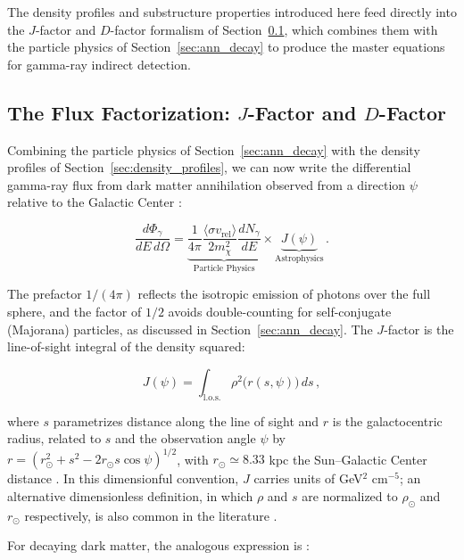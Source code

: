 The density profiles and substructure properties introduced here feed directly into the $J$-factor and $D$-factor formalism of Section~\ref{sec:jfactor}, which combines them with the particle physics of Section~\ref{sec:ann_decay} to produce the master equations for gamma-ray indirect detection.

\subsection{The Flux Factorization: $J$-Factor and $D$-Factor}
\label{sec:jfactor}

Combining the particle physics of Section~\ref{sec:ann_decay} with the density profiles of Section~\ref{sec:density_profiles}, we can now write the differential gamma-ray flux from dark matter annihilation observed from a direction $\psi$ relative to the Galactic Center \cite{Cirelli:2024ssz,Hooper:2024}:

\begin{equation}
	\frac{d\Phi_\gamma}{dE\, d\Omega} = \underbrace{\frac{1}{4\pi} \frac{\langle \sigma v_\text{rel} \rangle}{2 m_\chi^2} \frac{dN_\gamma}{dE}}_{\text{Particle Physics}} \times \underbrace{J(\psi)}_{\text{Astrophysics}} \,.
	\label{eq:flux_ann}
\end{equation}

The prefactor $1/(4\pi)$ reflects the isotropic emission of photons over the full sphere, and the factor of $1/2$ avoids double-counting for self-conjugate (Majorana) particles, as discussed in Section~\ref{sec:ann_decay}.
The $J$-factor is the line-of-sight integral of the density squared:

\begin{equation}
	J(\psi) = \int_\text{l.o.s.} \rho^2\bigl(r(s, \psi)\bigr) \, ds \,,
	\label{eq:jfactor}
\end{equation}

where $s$ parametrizes distance along the line of sight and $r$ is the galactocentric radius, related to $s$ and the observation angle $\psi$ by $r = (r_\odot^2 + s^2 - 2 r_\odot s \cos\psi)^{1/2}$, with $r_\odot \simeq 8.33$ kpc the Sun--Galactic Center distance \cite{Cirelli:2024ssz}.
In this dimensionful convention, $J$ carries units of GeV$^2$ cm$^{-5}$; an alternative dimensionless definition, in which $\rho$ and $s$ are normalized to $\rho_\odot$ and $r_\odot$ respectively, is also common in the literature \cite{Cirelli:2024ssz}.

For decaying dark matter, the analogous expression is \cite{Cirelli:2024ssz,Pinetti:2021jjs}:

